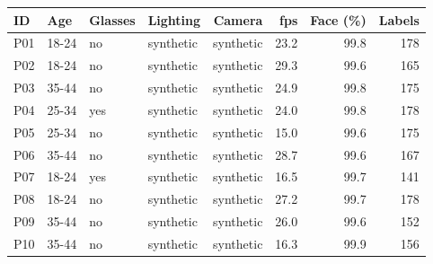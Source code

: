 \begin{tabular}{llllrrrr}
\toprule
ID & Age & Glasses & Lighting & Camera & fps & Face (\%) & Labels \\
\midrule
P01 & 18-24 & no & synthetic & synthetic & 23.2 & 99.8 & 178 \\
P02 & 18-24 & no & synthetic & synthetic & 29.3 & 99.6 & 165 \\
P03 & 35-44 & no & synthetic & synthetic & 24.9 & 99.8 & 175 \\
P04 & 25-34 & yes & synthetic & synthetic & 24.0 & 99.8 & 178 \\
P05 & 25-34 & no & synthetic & synthetic & 15.0 & 99.6 & 175 \\
P06 & 35-44 & no & synthetic & synthetic & 28.7 & 99.6 & 167 \\
P07 & 18-24 & yes & synthetic & synthetic & 16.5 & 99.7 & 141 \\
P08 & 18-24 & no & synthetic & synthetic & 27.2 & 99.7 & 178 \\
P09 & 35-44 & no & synthetic & synthetic & 26.0 & 99.6 & 152 \\
P10 & 35-44 & no & synthetic & synthetic & 16.3 & 99.9 & 156 \\
\bottomrule
\end{tabular}
